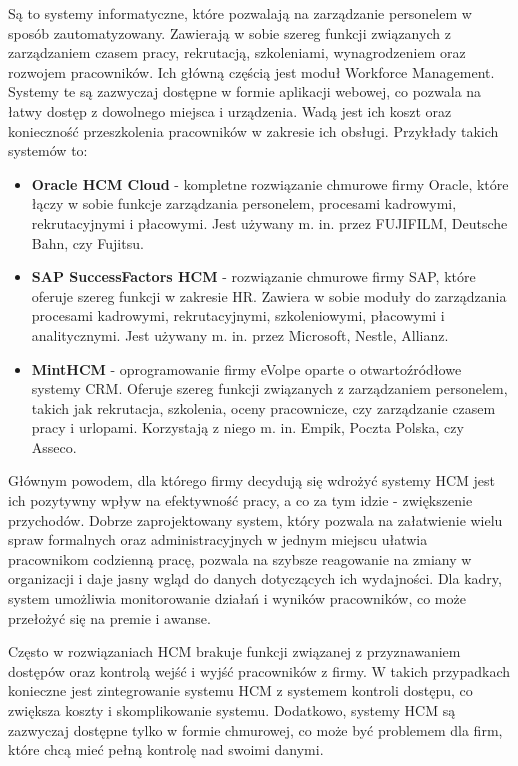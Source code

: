 Są to systemy informatyczne, które pozwalają na zarządzanie personelem w sposób zautomatyzowany. Zawierają w sobie szereg funkcji związanych z zarządzaniem czasem pracy, rekrutacją, szkoleniami, wynagrodzeniem oraz rozwojem pracowników. Ich główną częścią jest moduł Workforce Management. Systemy te są zazwyczaj dostępne w formie aplikacji webowej, co pozwala na łatwy dostęp z dowolnego miejsca i urządzenia. Wadą jest ich koszt oraz konieczność przeszkolenia pracowników w zakresie ich obsługi. Przykłady takich systemów to:

\begin{itemize}
    \item \textbf{Oracle HCM Cloud} - kompletne rozwiązanie chmurowe firmy Oracle, które łączy w sobie funkcje zarządzania personelem, procesami kadrowymi, rekrutacyjnymi i płacowymi. Jest używany m. in. przez FUJIFILM, Deutsche Bahn, czy Fujitsu.
    \item \textbf{SAP SuccessFactors HCM} - rozwiązanie chmurowe firmy SAP, które oferuje szereg funkcji w zakresie HR. Zawiera w sobie moduły do zarządzania procesami kadrowymi, rekrutacyjnymi, szkoleniowymi, płacowymi i analitycznymi. Jest używany m. in. przez Microsoft, Nestle, Allianz.
    \item \textbf{MintHCM} - oprogramowanie firmy eVolpe oparte o otwartoźródłowe systemy CRM. Oferuje szereg funkcji związanych z zarządzaniem personelem, takich jak rekrutacja, szkolenia, oceny pracownicze, czy zarządzanie czasem pracy i urlopami.  Korzystają z niego m. in. Empik, Poczta Polska, czy Asseco.
\end{itemize}

Głównym powodem, dla którego firmy decydują się wdrożyć systemy HCM jest ich pozytywny wpływ na efektywność pracy, a co za tym idzie - zwiększenie przychodów. Dobrze zaprojektowany system, który pozwala na załatwienie wielu spraw formalnych oraz administracyjnych w jednym miejscu ułatwia pracownikom codzienną pracę, pozwala na szybsze reagowanie na zmiany w organizacji i daje jasny wgląd do danych dotyczących ich wydajności. Dla kadry, system umożliwia monitorowanie działań i wyników pracowników, co może przełożyć się na premie i awanse.

Często w rozwiązaniach HCM brakuje funkcji związanej z przyznawaniem dostępów oraz kontrolą wejść i wyjść pracowników z firmy. W takich przypadkach konieczne jest zintegrowanie systemu HCM z systemem kontroli dostępu, co zwiększa koszty i skomplikowanie systemu. Dodatkowo, systemy HCM są zazwyczaj dostępne tylko w formie chmurowej, co może być problemem dla firm, które chcą mieć pełną kontrolę nad swoimi danymi.

